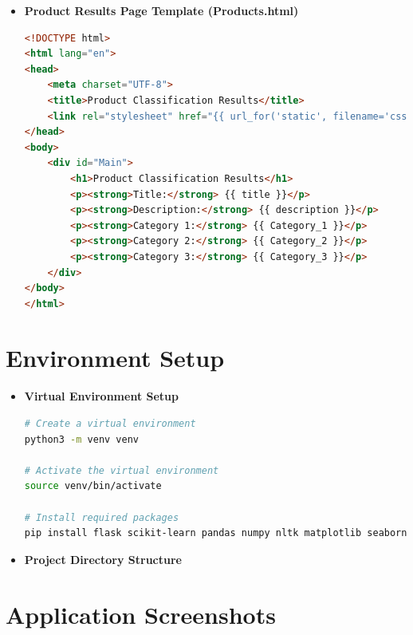\documentclass[10pt]{article}
\begin{document}
\begin{itemize}
    \item \textbf{Product Results Page Template (Products.html)}
    \begin{lstlisting}[language=HTML]
<!DOCTYPE html>
<html lang="en">
<head>
    <meta charset="UTF-8">
    <title>Product Classification Results</title>
    <link rel="stylesheet" href="{{ url_for('static', filename='css/style.css') }}">
</head>
<body>
    <div id="Main">
        <h1>Product Classification Results</h1>
        <p><strong>Title:</strong> {{ title }}</p>
        <p><strong>Description:</strong> {{ description }}</p>
        <p><strong>Category 1:</strong> {{ Category_1 }}</p>
        <p><strong>Category 2:</strong> {{ Category_2 }}</p>
        <p><strong>Category 3:</strong> {{ Category_3 }}</p>
    </div>
</body>
</html>
    \end{lstlisting}
\end{itemize}

\section{Environment Setup}

\begin{itemize}
    \item \textbf{Virtual Environment Setup}
    \begin{lstlisting}[language=Bash]
# Create a virtual environment
python3 -m venv venv

# Activate the virtual environment
source venv/bin/activate

# Install required packages
pip install flask scikit-learn pandas numpy nltk matplotlib seaborn
    \end{lstlisting}

    \item \textbf{Project Directory Structure}
\end{itemize}

\section{Application Screenshots}
\end{document}
